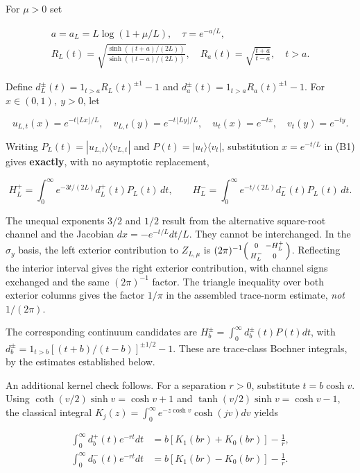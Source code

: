 \documentclass[
  10pt,
  a4paper,
]{article}
\begin{document}
For \(\mu>0\) set

\[
\begin{gathered}
a=a_L=L\log(1+\mu/L),\quad \tau=e^{-a/L},\\
R_L(t)=\sqrt{\frac{\sinh((t+a)/(2L))}{\sinh((t-a)/(2L))}},\quad
R_a(t)=\sqrt{\frac{t+a}{t-a}},\quad t>a.
\end{gathered}
\]

Define \(d_L^\pm(t)=1_{t>a}R_L(t)^{\pm1}-1\) and \(d_a^\pm(t)=1_{t>a}R_a(t)^{\pm1}-1\). For \(x\in(0,1),\ y>0\), let

\[
u_{L,t}(x)=e^{-t\lfloor Lx\rfloor/L},\quad v_{L,t}(y)=e^{-t\lfloor Ly\rfloor/L},\quad
u_t(x)=e^{-tx},\quad v_t(y)=e^{-ty}.
\]

Writing \(P_L(t)=|u_{L,t}\rangle\langle v_{L,t}|\) and \(P(t)=|u_t\rangle\langle v_t|\), substitution \(x=e^{-t/L}\) in (B1) gives \textbf{exactly}, with no asymptotic replacement,

\[
H_L^+=\int_0^\infty e^{-3t/(2L)}d_L^+(t)P_L(t)\,dt,
\qquad H_L^-=\int_0^\infty e^{-t/(2L)}d_L^-(t)P_L(t)\,dt.
\tag{B2}
\]

The unequal exponents \(3/2\) and \(1/2\) result from the alternative square-root channel and the Jacobian \(dx=-e^{-t/L}dt/L\). They cannot be interchanged. In the \(\sigma_y\) basis, the left exterior contribution to \(Z_{L,\mu}\) is \((2\pi)^{-1}\begin{psmallmatrix}0&-H_L^+\\H_L^-&0\end{psmallmatrix}\). Reflecting the interior interval gives the right exterior contribution, with channel signs exchanged and the same \((2\pi)^{-1}\) factor. The triangle inequality over both exterior columns gives the factor \textbf{\(1/\pi\)} in the assembled trace-norm estimate, \emph{not} \(1/(2\pi)\).

The corresponding continuum candidates are \(H_b^\pm=\int_0^\infty d_b^\pm(t)P(t)dt\), with \(d_b^\pm=1_{t>b}[(t+b)/(t-b)]^{\pm1/2}-1\). These are trace-class Bochner integrals, by the estimates established below.

An additional kernel check follows. For a separation \(r>0\), substitute \(t=b\cosh v\). Using \(\coth(v/2)\sinh v=\cosh v+1\) and \(\tanh(v/2)\sinh v=\cosh v-1\), the classical integral \(K_j(z)=\int_0^\infty e^{-z\cosh v}\cosh(jv)dv\) yields

\[
\boxed{\begin{aligned}
\int_0^\infty d_b^+(t)e^{-rt}dt&=b[K_1(br)+K_0(br)]-\frac1r,\\
\int_0^\infty d_b^-(t)e^{-rt}dt&=b[K_1(br)-K_0(br)]-\frac1r.
\end{aligned}}
\tag{B3}
\]
\end{document}
